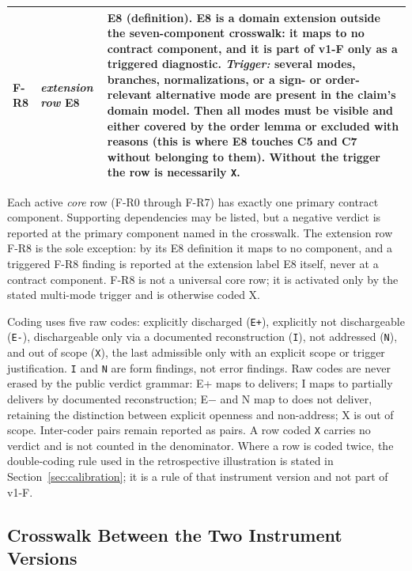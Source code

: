 \documentclass[11pt,a4paper]{article}
\begin{document}
\begin{table}[htbp]
\begin{tabularx}{\textwidth}{@{}l l X@{}}
\midrule
F-R8 & \emph{extension row} E8
  & \textbf{E8 (definition).} E8 is a domain extension outside the
    seven-component crosswalk: it maps to no contract component, and it is
    part of v1-F only as a triggered diagnostic. \emph{Trigger:} several
    modes, branches, normalizations, or a sign- or order-relevant
    alternative mode are present in the claim's domain model. Then all modes
    must be visible and either covered by the order lemma or excluded with
    reasons (this is where E8 touches C5 and C7 without belonging to them).
    Without the trigger the row is necessarily \texttt{X}. \\
\bottomrule
\end{tabularx}
\end{table}

Each active \emph{core} row (F-R0 through F-R7) has exactly one primary
contract component. Supporting dependencies may be listed, but a negative
verdict is reported at the primary component named in the crosswalk. The
extension row F-R8 is the sole exception: by its E8 definition it maps to no
component, and a triggered F-R8 finding is reported at the extension label
E8 itself, never at a contract component. F-R8 is not a universal core row;
it is activated only by the stated multi-mode trigger and is otherwise
coded X.

Coding uses five raw codes: explicitly discharged (\texttt{E+}), explicitly not
dischargeable (\texttt{E-}), dischargeable only via a documented reconstruction
(\texttt{I}), not addressed (\texttt{N}), and out of scope (\texttt{X}), the
last admissible only with an explicit scope or trigger justification.
\texttt{I} and \texttt{N} are form findings, not error findings. Raw codes are
never erased by the public verdict grammar: E+ maps to delivers; I maps to
partially delivers by documented reconstruction; E$-$ and N map to does not
deliver, retaining the distinction between explicit openness and non-address; X
is out of scope. Inter-coder pairs remain reported as pairs. A row coded
\texttt{X} carries no verdict and is not counted in the denominator. Where a row
is coded twice, the double-coding rule used in the retrospective illustration is
stated in Section~\ref{sec:calibration}; it is a rule of that instrument version
and not part of v1-F.

\subsection{Crosswalk Between the Two Instrument Versions}\label{sec:crosswalk}
\end{document}

